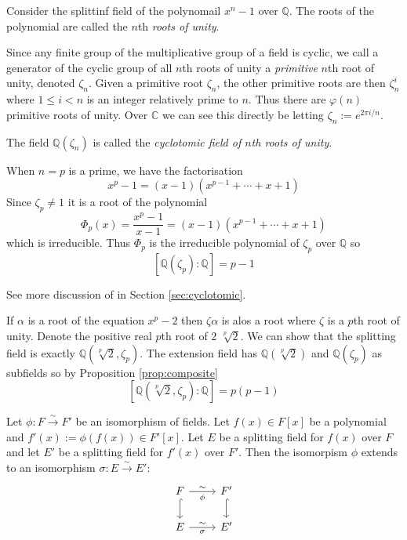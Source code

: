 \documentclass[a4paper]{article}
\begin{document}
\begin{eg}
  Consider the splittinf field of the polynomail $x^n-1$ over $\mathbb{Q}$. The roots of the polynomial are called the $n$th \emph{roots of unity}.

  Since any finite group of the multiplicative group of a field is cyclic, we call a generator of the cyclic group of all $n$th roots of unity a \emph{primitive} $n$th root of unity, denoted $\zeta_n$. Given a primitive root $\zeta_n$, the other primitive roots are then $\zeta_n^i$ where $1 \leq i < n$ is an integer relatively prime to $n$. Thus there are $\varphi(n)$ primitive roots of unity. Over $\mathbb{C}$ we can see this directly be letting $\zeta_n:=e^{2\pi i/n}$.

  The field $\mathbb{Q}(\zeta_n)$ is called the \emph{cyclotomic field of $n$th roots of unity}.

  When $n=p$ is a prime, we have the factorisation
  \[
    x^p-1 = (x-1)(x^{p-1}+\cdots+x+1)
  \]
  Since $\zeta_p \neq 1$ it is a root of the polynomial
  \[
    \Phi_p(x) = \frac{x^p-1}{x-1} = (x-1)(x^{p-1}+\cdots+x+1)
  \]
  which is irreducible. Thus $\Phi_p$ is the irreducible polynomial of $\zeta_p$ over $\mathbb{Q}$ so
  \[[\mathbb{Q}(\zeta_p):\mathbb{Q}] = p-1\]

  See more discussion of in Section \ref{sec:cyclotomic}.
\end{eg}

\begin{eg}
  If $\alpha$ is a root of the equation $x^p-2$ then $\zeta\alpha$ is alos a root where $\zeta$ is a $p$th root of unity. Denote the positive real $p$th root of $2$ $\sqrt[p]2$. We can show that the splitting field is exactly $\mathbb{Q}(\sqrt[p]2, \zeta_p)$. The extension field has $\mathbb{Q}(\sqrt[p]2)$ and $\mathbb{Q}(\zeta_p)$ as subfields so by Proposition \ref{prop:composite}
  \[ [\mathbb{Q}(\sqrt[p]2,\zeta_p):\mathbb{Q}] = p(p-1) \]
\end{eg}

\begin{theorem}
  Let $\phi: F\xrightarrow{\sim} F'$ be an isomorphism of fields. Let $f(x)\in F[x]$ be a polynomial and $f'(x):=\phi(f(x))\in F'[x]$. Let $E$ be a splitting field for $f(x)$ over $F$ and let $E'$ be a splitting field for $f'(x)$ over $F'$. Then the isomorpism $\phi$ extends to an isomorphism $\sigma:E\xrightarrow{\sim} E'$:
  \[
    \begin{tikzcd}
      F \arrow{r}{\sim}[swap]{\phi} \arrow[hook]{d} & F' \arrow[hook]{d}\\
      E \arrow{r}{\sim}[swap]{\sigma} & E'
    \end{tikzcd}
  \]
\end{theorem}
\end{document}
